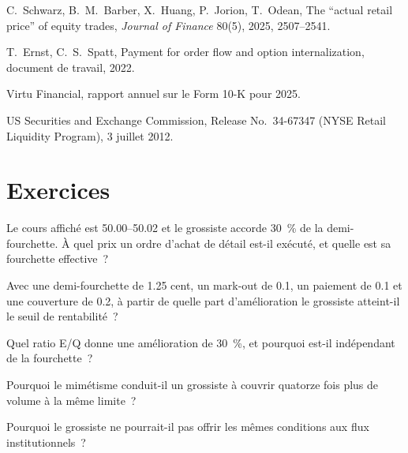 \begin{omsources}
\item C.~Schwarz, B.~M.~Barber, X.~Huang, P.~Jorion, T.~Odean, The ``actual retail price'' of equity trades, \emph{Journal of Finance} 80(5), 2025,
2507--2541.
\item T.~Ernst, C.~S.~Spatt, Payment for order flow and option internalization, document de travail, 2022.
\item Virtu Financial, rapport annuel sur le Form 10-K pour 2025.
\item US Securities and Exchange Commission, Release No.\ 34-67347 (NYSE Retail Liquidity Program), 3 juillet 2012.
\end{omsources}

\section{Exercices}

\begin{exercise}[$\star$]\label{exo:hf:retail-wholesaling:1}
Le cours affiché est 50.00--50.02 et le grossiste accorde 30~\% de la demi-fourchette. À quel prix un ordre d'achat de détail est-il exécuté, et quelle est sa
fourchette effective~?
\end{exercise}

\begin{exercise}[$\star$]\label{exo:hf:retail-wholesaling:2}
Avec une demi-fourchette de 1.25 cent, un mark-out de 0.1, un paiement de 0.1 et une couverture de 0.2, à partir de quelle part d'amélioration le grossiste atteint-il le seuil de rentabilité~?
\end{exercise}

\begin{exercise}[$\star$]\label{exo:hf:retail-wholesaling:3}
Quel ratio E/Q donne une amélioration de 30~\%, et pourquoi est-il indépendant de la fourchette~?
\end{exercise}

\begin{exercise}[$\star\star$]\label{exo:hf:retail-wholesaling:4}
Pourquoi le mimétisme conduit-il un grossiste à couvrir quatorze fois plus de volume à la même limite~?
\end{exercise}

\begin{exercise}[$\star\star$]\label{exo:hf:retail-wholesaling:5}
Pourquoi le grossiste ne pourrait-il pas offrir les mêmes conditions aux flux institutionnels~?
\end{exercise}

